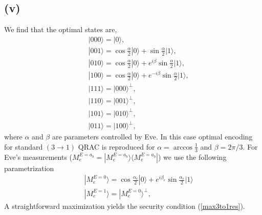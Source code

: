 \documentclass[smallextended]{svjour3}
\begin{document}
\subsection*{(v)}
We find that the optimal states are,
\begin{eqnarray}
&& |000\rangle=|0\rangle,\nonumber\\
&& |001\rangle=\cos \frac{\alpha}{2}|0\rangle+\sin\frac{\alpha}{2}|1\rangle,\nonumber\\
&& |010\rangle=\cos \frac{\alpha}{2}|0\rangle+e^{i\beta}\sin\frac{\alpha}{2}|1\rangle,\nonumber\\
&& |100\rangle=\cos \frac{\alpha}{2}|0\rangle+e^{-i\beta}\sin\frac{\alpha}{2}|1\rangle,\nonumber\\
&& |111\rangle=|000\rangle^\perp ,\nonumber \\
&& |110\rangle=|001\rangle^\perp ,\nonumber \\
&& |101\rangle=|010\rangle^\perp ,\nonumber \\
&& |011\rangle=|100\rangle^\perp,\label{a11}
\end{eqnarray}
where $\alpha$ and $\beta$ are parameters controlled by Eve.  In this case optimal encoding for standard $(3\to1)$ QRAC is reproduced for $\alpha=\arccos\frac{1}{3}$ and $\beta=2\pi/3$.
For Eve's measurements ($ M_e^{E=a_b}=|M_e^{E=a_b}\rangle\langle M_e^{E=a_b}|$) we use the following parametrization
\begin{eqnarray}
&& |M_e^{E=0}\rangle = \cos\frac{\alpha_e}{2}|0\rangle+e^{i\beta_e}\sin\frac{\alpha_e}{2}|1\rangle \nonumber \\
&& |M_e^{E=1}\rangle = |M_e^{E=0}\rangle^\perp \label{a2},
\end{eqnarray} 
A straightforward maximization yields the security condition (\ref{max3to1res}).
\end{document}
